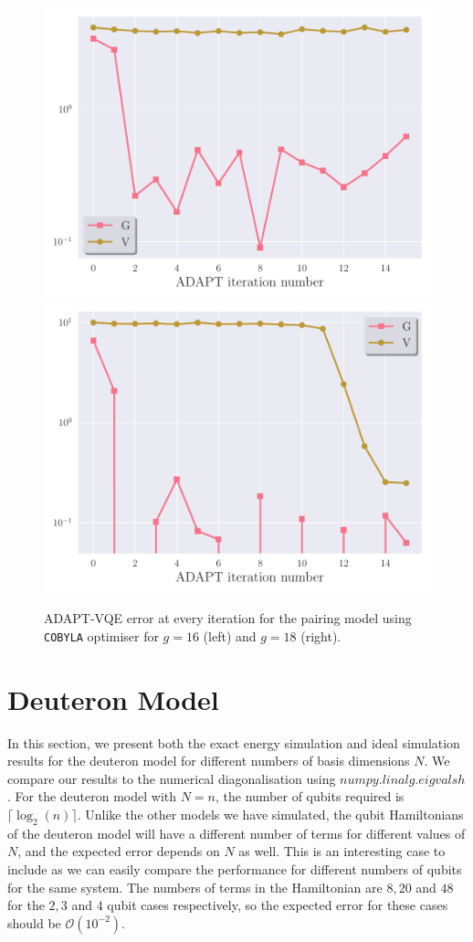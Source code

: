 \begin{figure}[ht]
    \centering
    \includegraphics[width=0.45\linewidth]{image/pairing_result/ideal simulation/g8.pdf}
    \includegraphics[width=0.45\linewidth]{image/pairing_result/ideal simulation/g=16adaptiter.pdf}
    \caption{ADAPT-VQE error at every iteration for the pairing model using \texttt{COBYLA} optimiser for $ g=16 $ (left) and $ g=18 $ (right).}
    \label{fig:8-16-iter}
\end{figure}


\section{Deuteron Model}
\label{sec:deuteron_result}


In this section, we present both the exact energy simulation and ideal simulation results for the deuteron model for different numbers of basis dimensions $ N $. We compare our results to the numerical diagonalisation using $ numpy.linalg.eigvalsh$. For the deuteron model with $ N=n $, the number of qubits required is $ \lceil \log_2( n ) \rceil$. Unlike the other models we have simulated, the qubit Hamiltonians of the deuteron model will have a different number of terms for different values of $ N $, and the expected error depends on $ N $ as well. This is an interesting case to include as we can easily compare the performance for different numbers of qubits for the same system. 
The numbers of terms in the Hamiltonian are $ 8,20$ and $48 $ for the $ 2,3$ and $4$ qubit cases respectively, so the expected error for these cases should be $ \mathcal{O}(10^{-2}) $.

